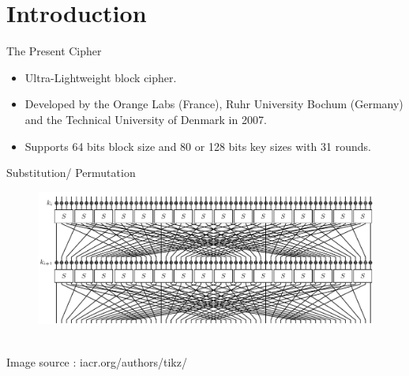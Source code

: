 \section{Introduction}


\begin{frame}{The Present Cipher}
\begin{itemize}
    \item Ultra-Lightweight block cipher.
    \item Developed by the Orange Labs (France), Ruhr University Bochum (Germany) and the Technical University of Denmark in 2007.
    \item Supports 64 bits block size and 80 or 128 bits key sizes with 31 rounds.
\end{itemize}
\end{frame}

\begin{frame}{Substitution/ Permutation}
\begin{figure}[H]
    \centering
    \includegraphics[width=\linewidth]{PRESENT_diagram.pdf}
\end{figure}
\begin{center}
    \\
    Image source : iacr.org/authors/tikz/
\end{center}
\end{frame}